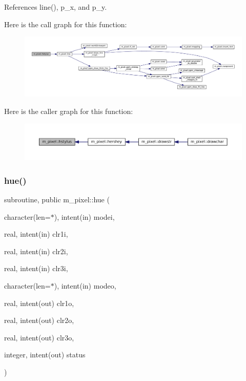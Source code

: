 References line(), p\+\_\+x, and p\+\_\+y.

Here is the call graph for this function\+:
\nopagebreak
\begin{figure}[H]
\begin{center}
\leavevmode
\includegraphics[width=350pt]{namespacem__pixel_a15c5daa9ab477991c2c6e17741cf40eb_cgraph}
\end{center}
\end{figure}
Here is the caller graph for this function\+:
\nopagebreak
\begin{figure}[H]
\begin{center}
\leavevmode
\includegraphics[width=350pt]{namespacem__pixel_a15c5daa9ab477991c2c6e17741cf40eb_icgraph}
\end{center}
\end{figure}
\mbox{\label{namespacem__pixel_aa76d2ac385f3ad0bc2b555cc14b7d53f}} 
\subsubsection{\texorpdfstring{hue()}{hue()}}
{\footnotesize\ttfamily subroutine, public m\+\_\+pixel\+::hue (\begin{DoxyParamCaption}\item[{character(len=$\ast$), intent(in)}]{modei,  }\item[{real, intent(in)}]{clr1i,  }\item[{real, intent(in)}]{clr2i,  }\item[{real, intent(in)}]{clr3i,  }\item[{character(len=$\ast$), intent(in)}]{modeo,  }\item[{real, intent(out)}]{clr1o,  }\item[{real, intent(out)}]{clr2o,  }\item[{real, intent(out)}]{clr3o,  }\item[{integer, intent(out)}]{status }\end{DoxyParamCaption})}



